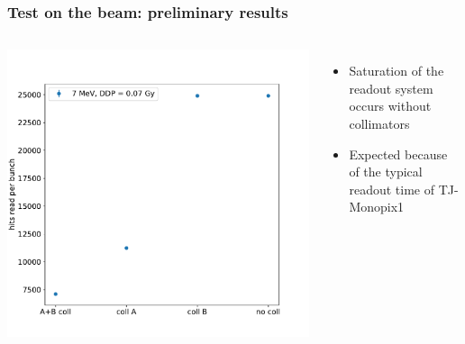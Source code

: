     \begin{frame}
        \frametitle{Test on the beam: preliminary results}
        \begin{columns}
                \includegraphics[width=1.1\linewidth]{figures/test_beam/hits.pdf}  
                \begin{itemize}
                    \item Saturation of the readout system occurs without collimators
                    \item Expected because of the typical readout time of TJ-Monopix1
                \end{itemize}
            \end{columns}
        \end{frame}  